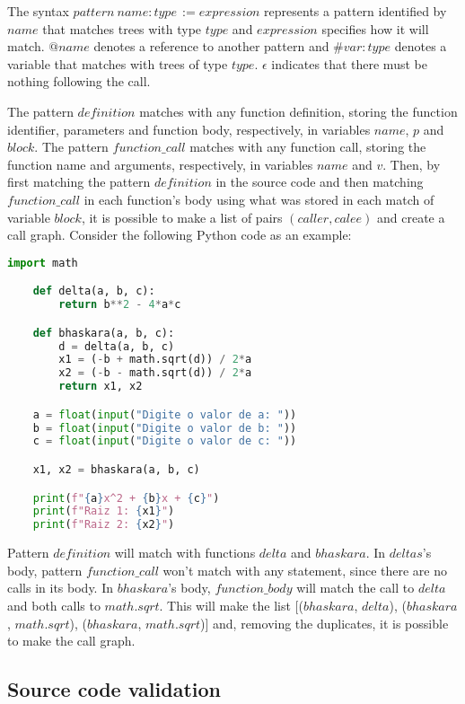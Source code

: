 The syntax \(pattern \: name : type \, := expression\) represents a pattern
identified by \(name\) that matches trees with type \(type\) and \(expression\)
specifies how it will match. \(@name\) denotes a reference to another pattern
and \(\#var:type\) denotes a variable that matches with trees of type \(type\).
\textit{\(\epsilon\)} indicates that there must be nothing following the call.

The pattern \(definition\) matches with any function definition, storing the
function identifier, parameters and function body, respectively, in variables \(name\),
\(p\) and \(block\). The pattern \(function\_call\) matches with any function
call, storing the function name and arguments, respectively, in variables \(name\)
and \(v\). Then, by first matching the pattern \(definition\) in the source code
and then matching \(function\_call\) in each function's body using what was stored in
each match of variable \(block\), it is possible to make a list of pairs \((caller, calee)\)
and create a call graph. Consider the following Python code as an example:


\begin{lstlisting}[language=Python]
    import math

    def delta(a, b, c):
        return b**2 - 4*a*c

    def bhaskara(a, b, c):
        d = delta(a, b, c)
        x1 = (-b + math.sqrt(d)) / 2*a
        x2 = (-b - math.sqrt(d)) / 2*a
        return x1, x2

    a = float(input("Digite o valor de a: "))
    b = float(input("Digite o valor de b: "))
    c = float(input("Digite o valor de c: "))

    x1, x2 = bhaskara(a, b, c)

    print(f"{a}x^2 + {b}x + {c}")
    print(f"Raiz 1: {x1}")
    print(f"Raiz 2: {x2}")
\end{lstlisting}

Pattern \(definition\) will match with functions \(delta\) and \(bhaskara\). In
\(deltas\)'s body, pattern \(function\_call\) won't match with any statement,
since there are no calls in its body. In \(bhaskara\)'s body, \(function\_body\)
will match the call to \(delta\) and both calls to \(math.sqrt\). This will make
the list [(\(bhaskara\), \(delta\)), (\(bhaskara\), \(math.sqrt\)),
(\(bhaskara\), \(math.sqrt\))]
and, removing the duplicates, it is possible to make the call graph.

\subsection{Source code validation}

